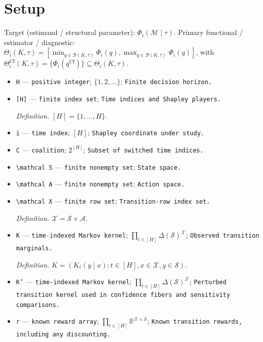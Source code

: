 \documentclass{article}
\begin{document}
\section{Setup}

Target (estimand / structural parameter): \(\Phi_i(\mathcal M\mid\tau)\).
Primary functional / estimator / diagnostic: \(\Theta_i(K,\tau)=[\min_{q\in\mathcal B(K,\tau)}\Phi_i(q),\max_{q\in\mathcal B(K,\tau)}\Phi_i(q)]\), with \(\Theta_i^{\mathrm{CI}}(K,\tau)=\{\Phi_i(q^{\mathrm{CI}})\}\subseteq\Theta_i(K,\tau)\).
\begin{itemize}
  \item \texttt{H} --- \texttt{positive integer}; \(\{1,2,\ldots\}\); \texttt{Finite decision horizon.}
  \item \texttt{[H]} --- \texttt{finite index set}; \texttt{Time indices and Shapley players.}
  \par\smallskip\noindent\emph{Definition.} \([H]=\{1,\ldots,H\}\).
  \item \texttt{i} --- \texttt{time index}; \([H]\); \texttt{Shapley coordinate under study.}
  \item \texttt{C} --- \texttt{coalition}; \(2^{[H]}\); \texttt{Subset of switched time indices.}
  \item \texttt{\textbackslash{}\allowbreak{}mathcal S} --- \texttt{finite nonempty set}; \texttt{State space.}
  \item \texttt{\textbackslash{}\allowbreak{}mathcal A} --- \texttt{finite nonempty set}; \texttt{Action space.}
  \item \texttt{\textbackslash{}\allowbreak{}mathcal X} --- \texttt{finite row set}; \texttt{Transition-\allowbreak{}row index set.}
  \par\smallskip\noindent\emph{Definition.} \(\mathcal X=\mathcal S\times\mathcal A\).
  \item \texttt{K} --- \texttt{time-\allowbreak{}indexed Markov kernel}; \(\prod_{t\in[H]}\Delta(\mathcal S)^{\mathcal X}\); \texttt{Observed transition marginals.}
  \par\smallskip\noindent\emph{Definition.} \(K=(K_t(y\mid x):t\in[H],x\in\mathcal X,y\in\mathcal S)\).
  \item \texttt{K'} --- \texttt{time-\allowbreak{}indexed Markov kernel}; \(\prod_{t\in[H]}\Delta(\mathcal S)^{\mathcal X}\); \texttt{Perturbed transition kernel used in confidence fibers and sensitivity comparisons.}
  \item \texttt{r} --- \texttt{known reward array}; \(\prod_{t\in[H]}\mathbb R^{\mathcal X\times\mathcal S}\); \texttt{Known transition rewards,\allowbreak{} including any discounting.}

\end{itemize}
\end{document}
